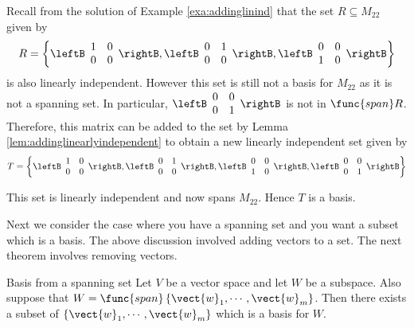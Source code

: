 \begin{solution}
Recall from the solution of Example \ref{exa:addinglinind} that the set  $R \subseteq M_{22}$ given by 
\[
R = \left\{ \leftB \begin{array}{rr}
1 & 0 \\
0 & 0 
\end{array} \rightB, \leftB \begin{array}{rr}
0 & 1 \\
0 & 0 
\end{array} \rightB, \leftB \begin{array}{rr}
0 & 0 \\
1 & 0 
\end{array} \rightB \right\}
\]
is also linearly independent.
However this set is still not a basis for $M_{22}$ as it is not a spanning set. In particular, $\leftB \begin{array}{rr}
0 & 0 \\
0 & 1 
\end{array} \rightB$ is not in $\func{span} R$. Therefore, this matrix can be added to the set by Lemma \ref{lem:addinglinearlyindependent} to obtain a new linearly independent set given by 
\[
T = \left\{ \leftB \begin{array}{rr}
1 & 0 \\
0 & 0 
\end{array} \rightB, \leftB \begin{array}{rr}
0 & 1 \\
0 & 0 
\end{array} \rightB, \leftB \begin{array}{rr}
0 & 0 \\
1 & 0 
\end{array} \rightB, \leftB \begin{array}{rr}
0 & 0 \\
0 & 1 
\end{array} \rightB \right\}
\]

This set is linearly independent and now spans $M_{22}$. Hence $T$ is a basis. 
\end{solution}

Next we consider the case where you have a
spanning set and you want a subset which is a basis. The above discussion involved adding vectors to a set. The next theorem involves removing vectors. 

\begin{theorem}{Basis from a spanning set}{}
Let $V$ be a vector space and let $W$ be a subspace. Also
suppose that $W=\func{span}\left\{ \vect{w}_{1},\cdots ,\vect{w}
_{m}\right\} $. Then there exists a subset of $\left\{ \vect{w}_{1},\cdots ,
\vect{w}_{m}\right\} $ which is a basis for $W$.
\end{theorem}

